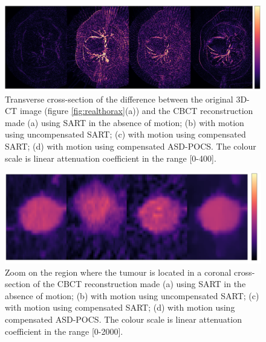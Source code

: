 \begin{figure}[H]
\begin{center} 
\includegraphics[width=1\linewidth]{MotionCorrection/res3err2.png} 
\hspace{0.1cm}{\footnotesize (a)}\hspace{3.2cm}{\footnotesize (b)}\hspace{3.2cm}{\footnotesize (c)}\hspace{3.2cm}{\footnotesize (d)}
\caption[Errors between the POPI model and recosntructed images]{\label{fig:res3err}  Transverse cross-section of the difference  between the original 3D-CT image (figure \ref{fig:realthorax}(a)) and the CBCT reconstruction made (a) using SART in the absence of motion; (b) with motion using uncompensated SART; (c) with motion using compensated SART; (d) with motion using compensated ASD-POCS. The colour scale is linear attenuation coefficient in the range [0-400].} 
\end{center} 
\end{figure}

\begin{figure}[H]
\begin{center} 
\includegraphics[width=1\linewidth]{MotionCorrection/tumourCC2.png}
\hspace{0.1cm}{\footnotesize (a)}\hspace{3.2cm}{\footnotesize (b)}\hspace{3.2cm}{\footnotesize (c)}\hspace{3.2cm}{\footnotesize (d)} 
\caption[Zoomed area of the tumour for SART, SART with motion, MC-SART and MC-ASD-POCS]{\label{fig:tumourCC}  Zoom on the region where the tumour is located in a coronal cross-section of the CBCT reconstruction made (a) using SART in the absence of motion; (b) with motion using uncompensated SART; (c) with motion using compensated SART; (d) with motion using compensated ASD-POCS. The colour scale is linear attenuation coefficient in the range [0-2000].} 
\end{center} 
\end{figure}

